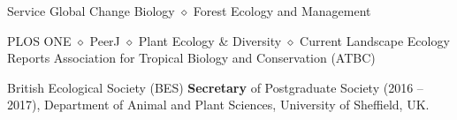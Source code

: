 
\begin{rubric}{Service}
    Global Change Biology $\diamond$ Forest Ecology and Management \par PLOS ONE $\diamond$ PeerJ $\diamond$ Plant Ecology \& Diversity $\diamond$ Current Landscape Ecology Reports
	Association for Tropical Biology and Conservation (ATBC) 
	\par British Ecological Society (BES)
    \textbf{Secretary} of Postgraduate Society (2016 -- 2017), Department of Animal and Plant Sciences, University of Sheffield, UK.
\end{rubric}
